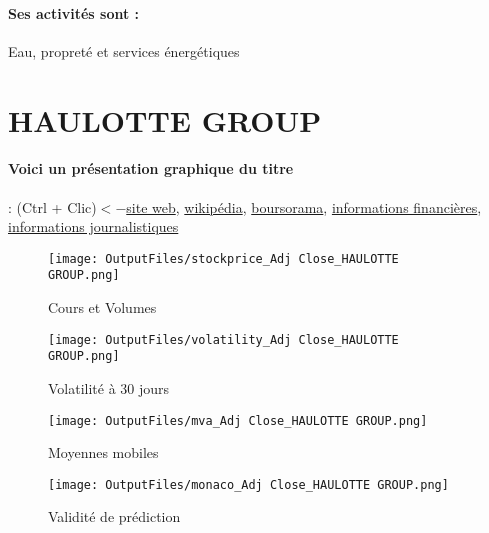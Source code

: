 \documentclass[11pt,a4paper]{report}%
\begin{document}
\paragraph{Ses activités sont : } Eau, propreté et services énergétiques  
    
    \newpage

\section{HAULOTTE GROUP}

\paragraph{Voici un présentation graphique du titre} : (Ctrl + Clic)$<-$\href{https://www.haulotte.com/fr/page/espace-investisseurs}{site web}, \href{https://fr.wikipedia.org/wiki/Haulotte_Group}{wikipédia}, \href{https://www.boursorama.com/cours/1rPPIG}{boursorama}, \href{https://www.qwant.com/?q=site:https:%2f%2fwww.easybourse.com%2faction-societe%2fHAULOTTE-GROUP&t=web&client=ext-firefox-hp}{informations financières}, \href{https://bourse.lerevenu.com/cours-de-bourse/fiche-valeur-synthese/HAULOTTE-GROUP/PIG-FR}{informations journalistiques}
\begin{figure}[!htb]
   \begin{minipage}{0.5\textwidth}
     \centering
     \texttt{[image: OutputFiles/stockprice\_Adj Close\_HAULOTTE GROUP.png]}
     \caption{Cours et Volumes}\label{Fig:price_HAULOTTE GROUP}
   \end{minipage}\hfill
   \begin{minipage}{0.5\textwidth}
     \centering
     \texttt{[image: OutputFiles/volatility\_Adj Close\_HAULOTTE GROUP.png]}
     \caption{Volatilité à 30 jours}\label{Fig:volat_HAULOTTE GROUP}
   \end{minipage}
\end{figure}
\begin{figure}[!htb]
   \begin{minipage}{0.5\textwidth}
     \centering
     \texttt{[image: OutputFiles/mva\_Adj Close\_HAULOTTE GROUP.png]}
     \caption{Moyennes mobiles}\label{Fig:mva_HAULOTTE GROUP}
   \end{minipage}\hfill
   \begin{minipage}{0.5\textwidth}
     \centering
     \texttt{[image: OutputFiles/monaco\_Adj Close\_HAULOTTE GROUP.png]}
     \caption{Validité de prédiction}\label{Fig:prediction_HAULOTTE GROUP}
   \end{minipage}
\end{figure}
\end{document}
